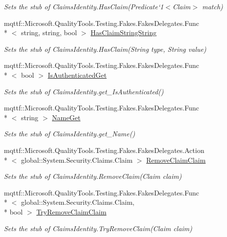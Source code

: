 \begin{DoxyCompactItemize}
\begin{DoxyCompactList}\small\item\em Sets the stub of Claims\-Identity.\-Has\-Claim(Predicate`1$<$Claim$>$ match)\end{DoxyCompactList}\item 
mqttf\-::\-Microsoft.\-Quality\-Tools.\-Testing.\-Fakes.\-Fakes\-Delegates.\-Func\\*
$<$ string, string, bool $>$ \hyperlink{class_system_1_1_security_1_1_claims_1_1_fakes_1_1_stub_claims_identity_a8dfe85f6eb742c250175b65ac9a86d6e}{Has\-Claim\-String\-String}
\begin{DoxyCompactList}\small\item\em Sets the stub of Claims\-Identity.\-Has\-Claim(\-String type, String value)\end{DoxyCompactList}\item 
mqttf\-::\-Microsoft.\-Quality\-Tools.\-Testing.\-Fakes.\-Fakes\-Delegates.\-Func\\*
$<$ bool $>$ \hyperlink{class_system_1_1_security_1_1_claims_1_1_fakes_1_1_stub_claims_identity_a58937e27cae2f39360373726634d96bd}{Is\-Authenticated\-Get}
\begin{DoxyCompactList}\small\item\em Sets the stub of Claims\-Identity.\-get\-\_\-\-Is\-Authenticated()\end{DoxyCompactList}\item 
mqttf\-::\-Microsoft.\-Quality\-Tools.\-Testing.\-Fakes.\-Fakes\-Delegates.\-Func\\*
$<$ string $>$ \hyperlink{class_system_1_1_security_1_1_claims_1_1_fakes_1_1_stub_claims_identity_a21f99321ca84c5b5f0344e1d70daa06d}{Name\-Get}
\begin{DoxyCompactList}\small\item\em Sets the stub of Claims\-Identity.\-get\-\_\-\-Name()\end{DoxyCompactList}\item 
mqttf\-::\-Microsoft.\-Quality\-Tools.\-Testing.\-Fakes.\-Fakes\-Delegates.\-Action\\*
$<$ global\-::\-System.\-Security.\-Claims.\-Claim $>$ \hyperlink{class_system_1_1_security_1_1_claims_1_1_fakes_1_1_stub_claims_identity_acd36c591c9dab643b11acc1fb63a430a}{Remove\-Claim\-Claim}
\begin{DoxyCompactList}\small\item\em Sets the stub of Claims\-Identity.\-Remove\-Claim(\-Claim claim)\end{DoxyCompactList}\item 
mqttf\-::\-Microsoft.\-Quality\-Tools.\-Testing.\-Fakes.\-Fakes\-Delegates.\-Func\\*
$<$ global\-::\-System.\-Security.\-Claims.\-Claim, \\*
bool $>$ \hyperlink{class_system_1_1_security_1_1_claims_1_1_fakes_1_1_stub_claims_identity_a2e4fa03d6fa8676dc45462be4a6ae055}{Try\-Remove\-Claim\-Claim}
\begin{DoxyCompactList}\small\item\em Sets the stub of Claims\-Identity.\-Try\-Remove\-Claim(\-Claim claim)\end{DoxyCompactList}\end{DoxyCompactItemize}
